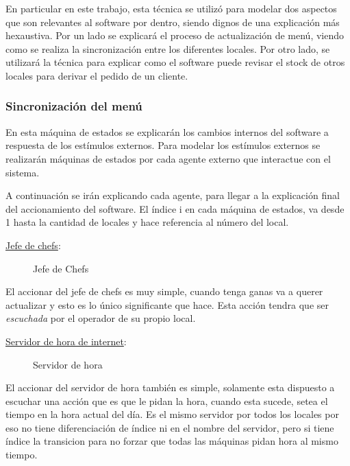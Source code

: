 \documentclass[a4paper,10pt]{article}
\begin{document}
En particular en este trabajo, esta t\'ecnica se utiliz\'o para modelar dos aspectos que son relevantes al software por dentro, siendo dignos de una explicaci\'on m\'as hexaustiva. Por un lado se explicar\'a el proceso de actualizaci\'on de men\'u, viendo como se realiza la sincronizaci\'on entre los diferentes locales. Por otro lado, se utilizar\'a la t\'ecnica para explicar como el software puede revisar el stock de otros locales para derivar el pedido de un cliente.


\subsubsection*{Sincronizaci\'on del men\'u}

En esta m\'aquina de estados se explicar\'an los cambios internos del software a respuesta de los est\'imulos externos. Para modelar los est\'imulos externos se realizar\'an m\'aquinas de estados por cada agente externo que interactue con el sistema.

A continuaci\'on se ir\'an explicando cada agente, para llegar a la explicaci\'on final del accionamiento del software.
El \'indice i en cada m\'aquina de estados, va desde 1 hasta la cantidad de locales y hace referencia al n\'umero del local.

\noindent \underline{Jefe de chefs}:

\begin{figure}[H]
\centering
{}
\caption{Jefe de Chefs}
\end{figure}

El accionar del jefe de chefs es muy simple, cuando tenga ganas va a querer actualizar y esto es lo \'unico significante que hace. Esta acci\'on tendra que ser \emph{escuchada} por el operador de su propio local.

\bigskip

\noindent \underline{Servidor de hora de internet}:

\begin{figure}[H]
\centering
{}
\caption{Servidor de hora}
\end{figure}

El accionar del servidor de hora tambi\'en es simple, solamente esta dispuesto a escuchar una acci\'on que es que le pidan la hora, cuando esta sucede, setea el tiempo en la hora actual del d\'ia. Es el mismo servidor por todos los locales por eso no tiene diferenciaci\'on de \'indice ni en el nombre del servidor, pero si tiene \'indice la transicion para no forzar que todas las m\'aquinas pidan hora al mismo tiempo.
\end{document}
